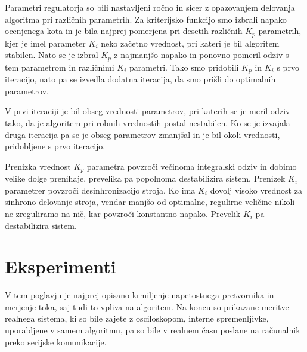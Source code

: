 \documentclass[a4paper,twoside,openright,12pt,slovene]{book}
\begin{document}
Parametri regulatorja so bili nastavljeni ročno in sicer z opazovanjem delovanja algoritma pri različnih parametrih. Za kriterijsko funkcijo smo izbrali napako ocenjenega kota in je bila najprej
pomerjena pri desetih različnih $K_p$ parametrih, kjer je imel parameter $K_i$ neko začetno vrednost, pri kateri je bil algoritem stabilen. Nato se je izbral $K_p$ z najmanjšo napako in ponovno pomeril
odziv s tem parametrom in različnimi $K_i$ parametri. Tako smo pridobili $K_p$ in $K_i$ s prvo iteracijo, nato pa se izvedla dodatna iteracija, da smo prišli do optimalnih parametrov. 

V prvi iteraciji je bil obseg vrednosti parametrov, pri katerih se je meril odziv tako, da je algoritem pri robnih vrednostih postal nestabilen. Ko se je izvajala druga iteracija pa se je obseg
parametrov zmanjšal in je bil okoli vrednosti, pridobljene s prvo iteracijo.

Prenizka vrednost $K_p$ parametra povzroči večinoma integralski odziv in dobimo velike dolge prenihaje, prevelika pa popolnoma destabilizira sistem. Prenizek $K_i$ parametrer povzroči desinhronizacijo
stroja. Ko ima $K_i$ dovolj visoko vrednost za sinhrono delovanje stroja, vendar manjšo od optimalne, regulirne veličine nikoli ne zreguliramo na nič, kar povzroči konstantno napako.  Prevelik $K_i$
pa destabilizira sistem.

\chapter{Eksperimenti}  \label{eksperimenti}

V tem poglavju je najprej opisano krmiljenje napetostnega pretvornika in merjenje toka, saj tudi to vpliva na algoritem. Na koncu so prikazane meritve realnega sistema, ki so bile zajete z
osciloskopom, interne spremenljivke, uporabljene v samem algoritmu, pa so bile v realnem času poslane na računalnik preko serijske komunikacije.
\end{document}
